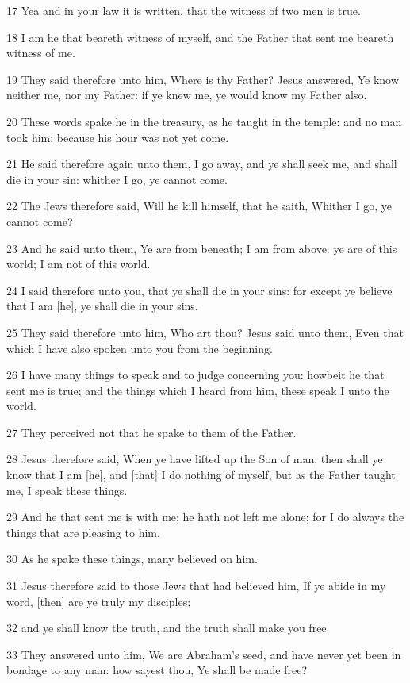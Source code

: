 \par 17 Yea and in your law it is written, that the witness of two men is true.
\par 18 I am he that beareth witness of myself, and the Father that sent me beareth witness of me.
\par 19 They said therefore unto him, Where is thy Father? Jesus answered, Ye know neither me, nor my Father: if ye knew me, ye would know my Father also.
\par 20 These words spake he in the treasury, as he taught in the temple: and no man took him; because his hour was not yet come.
\par 21 He said therefore again unto them, I go away, and ye shall seek me, and shall die in your sin: whither I go, ye cannot come.
\par 22 The Jews therefore said, Will he kill himself, that he saith, Whither I go, ye cannot come?
\par 23 And he said unto them, Ye are from beneath; I am from above: ye are of this world; I am not of this world.
\par 24 I said therefore unto you, that ye shall die in your sins: for except ye believe that I am [he], ye shall die in your sins.
\par 25 They said therefore unto him, Who art thou? Jesus said unto them, Even that which I have also spoken unto you from the beginning.
\par 26 I have many things to speak and to judge concerning you: howbeit he that sent me is true; and the things which I heard from him, these speak I unto the world.
\par 27 They perceived not that he spake to them of the Father.
\par 28 Jesus therefore said, When ye have lifted up the Son of man, then shall ye know that I am [he], and [that] I do nothing of myself, but as the Father taught me, I speak these things.
\par 29 And he that sent me is with me; he hath not left me alone; for I do always the things that are pleasing to him.
\par 30 As he spake these things, many believed on him.
\par 31 Jesus therefore said to those Jews that had believed him, If ye abide in my word, [then] are ye truly my disciples;
\par 32 and ye shall know the truth, and the truth shall make you free.
\par 33 They answered unto him, We are Abraham's seed, and have never yet been in bondage to any man: how sayest thou, Ye shall be made free?
